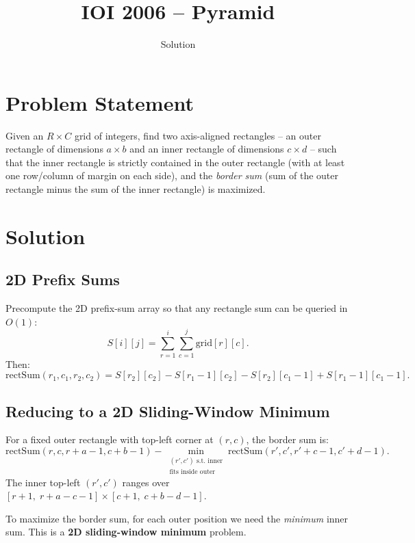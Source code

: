 \documentclass[11pt,a4paper]{article}
\title{IOI 2006 -- Pyramid}
\author{Solution}
\date{}
\begin{document}
\maketitle

\section{Problem Statement}
Given an $R \times C$ grid of integers, find two axis-aligned rectangles -- an outer rectangle of dimensions $a \times b$ and an inner rectangle of dimensions $c \times d$ -- such that the inner rectangle is strictly contained in the outer rectangle (with at least one row/column of margin on each side), and the \emph{border sum} (sum of the outer rectangle minus the sum of the inner rectangle) is maximized.

\section{Solution}

\subsection{2D Prefix Sums}
Precompute the 2D prefix-sum array so that any rectangle sum can be queried in $O(1)$:
\[
S[i][j] = \sum_{r=1}^{i} \sum_{c=1}^{j} \text{grid}[r][c].
\]
Then:
\[
\text{rectSum}(r_1, c_1, r_2, c_2) = S[r_2][c_2] - S[r_1{-}1][c_2] - S[r_2][c_1{-}1] + S[r_1{-}1][c_1{-}1].
\]

\subsection{Reducing to a 2D Sliding-Window Minimum}
For a fixed outer rectangle with top-left corner at $(r, c)$, the border sum is:
\[
\text{rectSum}(r, c, r{+}a{-}1, c{+}b{-}1) - \min_{\substack{(r', c') \text{ s.t. inner} \\ \text{fits inside outer}}} \text{rectSum}(r', c', r'{+}c{-}1, c'{+}d{-}1).
\]
The inner top-left $(r', c')$ ranges over $[r+1,\; r+a-c-1] \times [c+1,\; c+b-d-1]$.

To maximize the border sum, for each outer position we need the \emph{minimum} inner sum. This is a \textbf{2D sliding-window minimum} problem.
\end{document}
